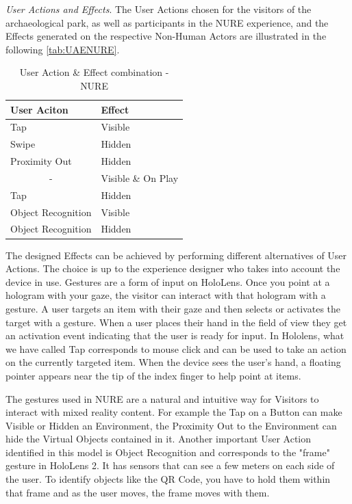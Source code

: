 \emph{User Actions and Effects}. The User Actions chosen for the visitors of the archaeological park, as well as participants in the NURE experience, and the Effects generated on the respective Non-Human Actors are illustrated in the following \autoref{tab:UAENURE}.
\begin{table}[h]
\centering
\begin{tabular}{|l|l|}
\hline
\textbf{User Aciton}    & \textbf{Effect}    \\ \hline
Tap                     & Visible            \\ \hline
Swipe                   & Hidden             \\ \hline
Proximity Out           & Hidden             \\ \hline
\multicolumn{1}{|c|}{-} & Visible \& On Play \\ \hline
Tap                     & Hidden             \\ \hline
Object Recognition      & Visible            \\ \hline
Object Recognition      & Hidden             \\ \hline
\end{tabular}
\caption{User Action \& Effect combination - NURE}
\label{tab:UAENURE}
\end{table}

The designed Effects can be achieved by performing different alternatives of User Actions. The choice is up to the experience designer who takes into account the device in use. Gestures are a form of input on HoloLens. Once you point at a hologram with your gaze, the visitor can interact with that hologram with a gesture. A user targets an item with their gaze and then selects or activates the target with a gesture. When a user places their hand in the field of view they get an activation event indicating that the user is ready for input.
In Hololens, what we have called Tap corresponds to mouse click and can be used to take an action on the currently targeted item. When the device sees the user's hand, a floating pointer appears near the tip of the index finger to help point at items. 

The gestures used in NURE are a natural and intuitive way for Visitors to interact with mixed reality content. For example the Tap on a Button can make Visible or Hidden an Environment, the Proximity Out to the Environment can hide the Virtual Objects contained in it. Another important User Action identified in this model is Object Recognition and corresponds to the "frame" gesture in HoloLens 2. It has sensors that can see a few meters on each side of the user. To identify objects like the QR Code, you have to hold them within that frame and as the user moves, the frame moves with them. 


